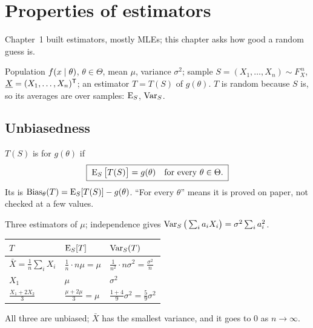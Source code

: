 \chapter{Properties of estimators}

Chapter~1 built estimators, mostly MLEs; this chapter asks how good a random guess is.

\begin{setup}
Population $f(x\mid\theta)$, $\theta\in\Theta$, mean $\mu$, variance $\sigma^2$; sample $S=(X_1,\dots,X_n)\sim F_X^{\,n}$, $\underline{X}=(X_1,\dots,X_n)^{\mathsf{T}}$; an estimator $T=T(S)$ of $g(\theta)$. $T$ is random because $S$ is, so its averages are over samples: $\operatorname{E}_S$, $\operatorname{Var}_S$.
\end{setup}

\section{Unbiasedness}

\begin{definition}
$T(S)$ is  for $g(\theta)$ if
\[
  \boxed{\;\operatorname{E}_S\big[T(S)\big]=g(\theta)\quad\text{for every }\theta\in\Theta.\;}
\]
Its  is $\operatorname{Bias}_\theta(T)=\operatorname{E}_S[T(S)]-g(\theta)$. ``For every $\theta$'' means it is proved on paper, not checked at a few values.
\end{definition}

\begin{example}
Three estimators of $\mu$; independence gives $\operatorname{Var}_S\big(\sum_ia_iX_i\big)=\sigma^2\sum_ia_i^2$.
\begin{center}
\renewcommand{\arraystretch}{1.4}
\begin{tabular}{@{}lll@{}}
\toprule
$T$ & $\operatorname{E}_S[T]$ & $\operatorname{Var}_S(T)$\\
\midrule
$\bar X=\frac1n\sum_iX_i$ & $\frac1n\cdot n\mu=\mu$ & $\frac1{n^2}\cdot n\sigma^2=\frac{\sigma^2}{n}$\\
$X_1$ & $\mu$ & $\sigma^2$\\
$\frac{X_1+2X_2}{3}$ & $\frac{\mu+2\mu}{3}=\mu$ & $\frac{1+4}{9}\sigma^2=\frac59\sigma^2$\\
\bottomrule
\end{tabular}
\end{center}
All three are unbiased; $\bar X$ has the smallest variance, and it goes to $0$ as $n\to\infty$.
\end{example}

